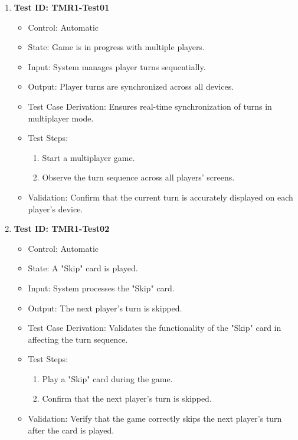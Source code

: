 \documentclass[12pt, titlepage]{article}
\begin{document}
\begin{enumerate}
    \item \textbf{Test ID: TMR1-Test01}
        \begin{itemize}
            \item Control: Automatic
            \item State: Game is in progress with multiple players.
            \item Input: System manages player turns sequentially.
            \item Output: Player turns are synchronized across all devices.
            \item Test Case Derivation: Ensures real-time synchronization of turns in multiplayer mode.
            \item Test Steps:
                \begin{enumerate}
                    \item Start a multiplayer game.
                    \item Observe the turn sequence across all players' screens.
                \end{enumerate}
            \item Validation: Confirm that the current turn is accurately displayed on each player's device.
        \end{itemize}

    \item \textbf{Test ID: TMR1-Test02}
        \begin{itemize}
            \item Control: Automatic
            \item State: A "Skip" card is played.
            \item Input: System processes the "Skip" card.
            \item Output: The next player’s turn is skipped.
            \item Test Case Derivation: Validates the functionality of the "Skip" card in affecting the turn sequence.
            \item Test Steps:
                \begin{enumerate}
                    \item Play a "Skip" card during the game.
                    \item Confirm that the next player’s turn is skipped.
                \end{enumerate}
            \item Validation: Verify that the game correctly skips the next player’s turn after the card is played.
        \end{itemize}


\end{enumerate}
\end{document}
